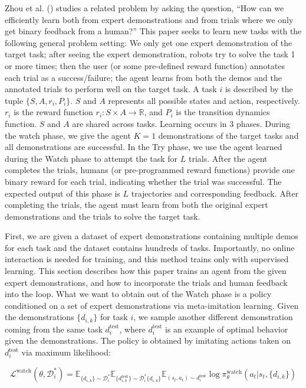 \documentclass[
  letterpaper,
  numbers=noenddot,
  DIV=11]{scrreprt}
\theoremstyle{definition}
\theoremstyle{plain}
\theoremstyle{plain}
\theoremstyle{remark}
\begin{document}
Zhou et al. () studies a related
problem by asking the question, ``How can we efficiently learn both from
expert demonstrations and from trials where we only get binary feedback
from a human?'' This paper seeks to learn new tasks with the following
general problem setting: We only get one expert demonstration of the
target task; after seeing the expert demonstration, robots try to solve
the task 1 or more times; then the user (or some pre-defined reward
function) annotates each trial as a success/failure; the agent learns
from both the demos and the annotated trials to perform well on the
target task. A task \(i\) is described by the tuple
\(\{S, A, r_i, P_i\}\). \(S\) and \(A\) represents all possible states
and action, respectively. \(r_i\) is the reward function
\(r_i : S \times A \to \mathbb{R}\), and \(P_i\) is the transition
dynamics function. \(S\) and \(A\) are shared across tasks. Learning
occurs in 3 phases. During the watch phase, we give the agent \(K=1\)
demonstrations of the target tasks and all demonstrations are
successful. In the Try phase, we use the agent learned during the Watch
phase to attempt the task for \(L\) trials. After the agent completes
the trials, humans (or pre-programmed reward functions) provide one
binary reward for each trial, indicating whether the trial was
successful. The expected output of this phase is \(L\) trajectories and
corresponding feedback. After completing the trials, the agent must
learn from both the original expert demonstrations and the trials to
solve the target task.

First, we are given a dataset of expert demonstrations containing
multiple demos for each task and the dataset contains hundreds of tasks.
Importantly, no online interaction is needed for training, and this
method trains only with supervised learning. This section describes how
this paper trains an agent from the given expert demonstrations, and how
to incorporate the trials and human feedback into the loop. What we want
to obtain out of the Watch phase is a policy conditioned on a set of
expert demonstrations via meta-imitation learning. Given the
demonstrations \(\{d_{i,k}\}\) for task \(i\), we sample another
different demonstration coming from the same task \(d_i^{\text{test}}\),
where \(d_i^{\text{test}}\) is an example of optimal behavior given the
demonstrations. The policy is obtained by imitating actions taken on
\(d_i^{\text{test}}\) via maximum likelihood:

\[\mathcal{L}^\text{watch}(\theta, \mathcal{D}_i^*) = \mathbb{E}_{\{d_{i,k}\} \sim \mathcal{D}_i^*} \mathbb{E}_{\{d_{i,k}^{\text{test}}\} \sim \mathcal{D}_i^*  \{d_{i,k}\}} \mathbb{E}_{(s_t, a_t) \sim d_i^{\text{test}}} \log \pi_\theta^{\text{watch}} (a_t | s_t, \{d_{i,k}\})\]
\end{document}
